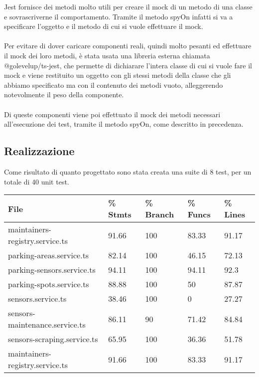 Jest fornisce dei metodi molto utili per creare il mock di un metodo di una classe e sovrascriverne il comportamento.
Tramite il metodo spyOn infatti si va a specificare l'oggetto e il metodo di cui si vuole effettuare il mock.
\\\\
Per evitare di dover caricare componenti reali, quindi molto pesanti ed effettuare il mock dei loro metodi, è stata
usata una libreria esterna chiamata @golevelup/ts-jest, che permette di dichiarare l'intera classe di cui si vuole fare
il mock e viene restituito un oggetto con gli stessi metodi della classe che gli abbiamo specificato ma con il contenuto 
dei metodi vuoto, 
alleggerendo notevolmente il peso della componente.
\\\\
Di queste componenti viene poi effettuato il mock dei metodi necessari all'esecuzione dei test, tramite il metodo
spyOn, come descritto in precedenza.
\clearpage
\subsection{Realizzazione}
Come risultato di quanto progettato sono stata creata una suite di 8 test, per un totale di 40 unit test.
\begin{table}[H]
    \begin{tabular}{|p{4.8cm}|p{1.5cm}|p{1.7cm}|p{1.5cm}| p{1.4cm} |} 
    \hline
    \textbf{File} & \textbf{\% Stmts} & \textbf{\% Branch} &  \textbf{\% Funcs} & \textbf{\% Lines} \\ 
    \hline
    maintainers-registry.service.ts & 91.66 & 100 & 83.33 & 91.17 \\ 
    \hline
    parking-areas.service.ts & 82.14 & 100 & 46.15 & 72.13 \\ 
    \hline
    parking-sensors.service.ts & 94.11 & 100 & 94.11 & 92.3 \\ 
    \hline
    parking-spots.service.ts & 88.88 & 100 & 50 & 87.87 \\ 
    \hline
    sensors.service.ts & 38.46 & 100 & 0 & 27.27 \\ 
    \hline
    sensors-maintenance.service.ts & 86.11 & 90 & 71.42 & 84.84 \\ 
    \hline
    sensors-scraping.service.ts & 65.95 & 100 & 36.36 & 51.78 \\ 
    \hline
    maintainers-registry.service.ts & 91.66 & 100 & 83.33 & 91.17 \\ 
    \hline
    \end{tabular}
\end{table}


